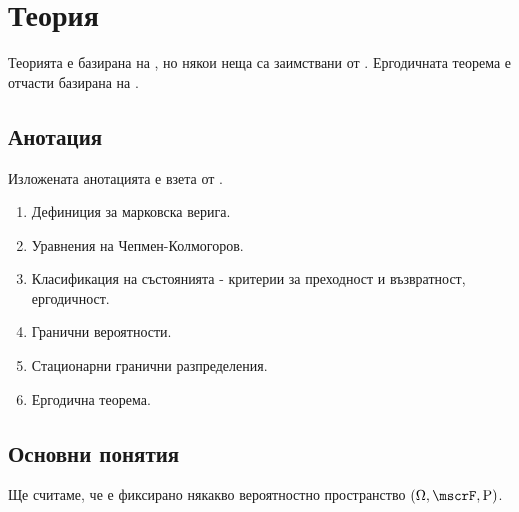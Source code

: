 \documentclass{../../common/topic}
\begin{document}
\maketitle

\section{Теория}

Теорията е базирана на \cite{Божкова2012Лекции}, но някои неща са заимствани от \cite{Боровков1999Вероятности}. Ергодичната теорема е отчасти базирана на \cite{Halidias2017}.

\subsection{Анотация}

Изложената анотацията е взета от \cite{Syllabus}.

\begin{enumerate}
  \item Дефиниция за марковска верига.
  \item Уравнения на Чепмен-Колмогоров.
  \item Класификация на състоянията - критерии за преходност и възвратност, ергодичност.
  \item Гранични вероятности.
  \item Стационарни гранични разпределения.
  \item Ергодична теорема.
\end{enumerate}

\subsection{Основни понятия}

Ще считаме, че е фиксирано някакво вероятностно пространство \( (\Omega, \mscrF, \Prob) \).
\end{document}
